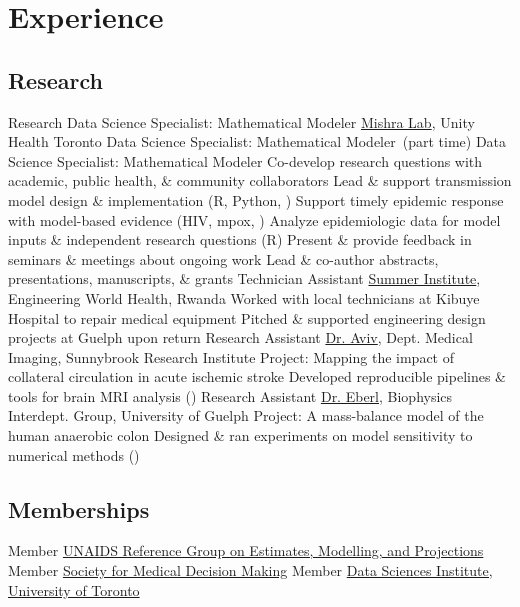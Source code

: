 \section{Experience}\twodate
\subsection{Research}
  {Research Data Science Specialist: Mathematical Modeler}
  {\href{http://mishra-lab.ca}{Mishra Lab}, Unity Health Toronto}
  {Data Science Specialist: Mathematical Modeler~\textnormal{(part time)}}{}
  {Data Science Specialist: Mathematical Modeler}{}
  \bullet Co-develop research questions with academic, public health, \& community collaborators
  \bullet Lead \& support transmission model design \& implementation (R, Python, \matlab)
  \bullet Support timely epidemic response with model-based evidence (HIV, mpox, \covid)
  \bullet Analyze epidemiologic data for model inputs \& independent research questions (R)
  \bullet Present \& provide feedback in seminars \& meetings about ongoing work
  \bullet Lead \& co-author abstracts, presentations, manuscripts, \& grants
  {Technician Assistant}
  {\href{https://www.ewh.org/the-institutes/summer-institute-programs}{Summer Institute}, Engineering World Health, Rwanda}
  \bullet Worked with local technicians at Kibuye Hospital to repair medical equipment
  \bullet Pitched \& supported engineering design projects at Guelph upon return
  {Research Assistant}
  {\href{https://www.uottawa.ca/brain/people/aviv-richard}{Dr. Aviv}, Dept. Medical Imaging, Sunnybrook Research Institute}
  \bullet Project: Mapping the impact of collateral circulation in acute ischemic stroke
  \bullet Developed reproducible pipelines \& tools for brain MRI analysis (\matlab)
  {Research Assistant}
  {\href{https://www.heberl.uoguelph.ca}{Dr. Eberl}, Biophysics Interdept. Group, University of Guelph}
  \bullet Project: A mass-balance model of the human anaerobic colon
  \bullet Designed \& ran experiments on model sensitivity to numerical methods (\matlab)
\subsection{Memberships}
  {Member}
  {\href{https://epidem.org}{UNAIDS Reference Group on Estimates, Modelling, and Projections}}
  {Member}
  {\href{https://smdm.org/}{Society for Medical Decision Making}}
  {Member}
  {\href{https://datasciences.utoronto.ca/}{Data Sciences Institute, University of Toronto}}

